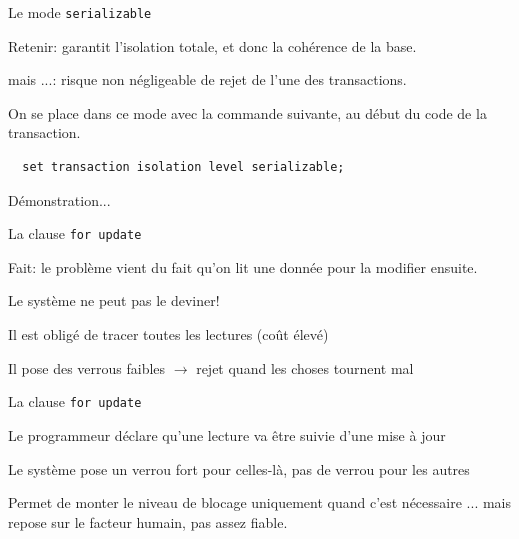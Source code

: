 \begin{frame}[fragile]{Le mode \texttt{serializable}}


\alert{Retenir}: garantit l'isolation totale, et donc la cohérence de la base.

\vfill

\alert{mais ...}: risque non négligeable de \alert{rejet} de l'une des transactions.


\vfill

On se place dans ce mode avec la commande suivante, au début du code de la transaction.

\begin{verbatim}
  set transaction isolation level serializable;
\end{verbatim}

\vfill

Démonstration...

\end{frame}

\begin{frame}{La clause \texttt{for update}}

\alert{Fait}: le problème vient du fait qu'on \alert{lit} une donnée pour la \alert{modifier} ensuite.

\begin{redbullet}
  \item Le système ne peut pas le deviner!
  \item Il est obligé de tracer toutes les lectures (coût élevé)
  \item Il pose des verrous faibles $\rightarrow$ rejet quand les choses tournent mal
\end{redbullet}

\vfill


La clause \texttt{for update}
\begin{redbullet}
  \item Le programmeur déclare qu'une lecture va être suivie d'une mise à jour
   \item Le système pose un verrou fort pour celles-là, pas de verrou pour les autres
\end{redbullet}

\vfill

\begin{blocgauche}
\alert{Permet de monter le niveau de blocage uniquement quand c'est nécessaire} ...
mais repose sur le facteur humain, pas assez fiable.
\end{blocgauche}
\end{frame}

